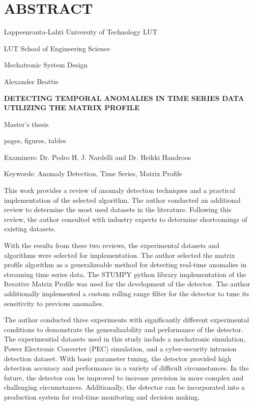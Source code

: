\section*{\MakeUppercase{Abstract}}
{}%
\thispagestyle{empty}
\begin{singlespace} 
{
Lappeenranta-Lahti University of Technology LUT \bigskip

\parskip=0pt %

LUT School of Engineering Science \bigskip

Mechatronic System Design \bigskip

Alexander Beattie \bigskip \bigskip

\textbf{\MakeUppercase{Detecting Temporal Anomalies in Time Series Data}} \\
\textbf{\MakeUppercase{Utilizing the Matrix Profile}} \bigskip\bigskip

Master's thesis \bigskip

\the\year{} \bigskip

\pageref{LastPage} pages,  figures,  tables \bigskip

Examiners: Dr. Pedro H. J. Nardelli and Dr. Heikki Handroos \bigskip\bigskip

Keywords: Anomaly Detection, Time Series, Matrix Profile \bigskip
}

This work provides a review of anomaly detection techniques and a practical implementation of the selected algorithm. The author conducted an additional review to determine the most used datasets in the literature. Following this review, the author consulted with industry experts to determine shortcomings of existing datasets.

With the results from these two reviews, the experimental datasets and algorithms were selected for implementation. The author selected the matrix profile algorithm as a generalizeable method for detecting real-time anomalies in streaming time series data. The STUMPY python library implementation of the Iterative Matrix Profile was used for the development of the detector. The author additionally implemented a custom rolling range filter for the detector to tune its sensitivity to previous anomalies. 

The author conducted three experiments with significantly different experimental conditions to demonstrate the generalizability and performance of the detector. The experimential datasets used in this study include a mechatronic simulation, Power Electronic Converter (PEC) simulation, and a cyber-security intrusion detection dataset.  With basic parameter tuning, the detector provided high detection accuracy and performance in a variety of difficult circumstances. In the future, the detector can be improved to increase precision in more complex and challenging circumstances. Additionally, the detector can be incorporated into a production system for real-time monitoring and decision making.
\end{singlespace}